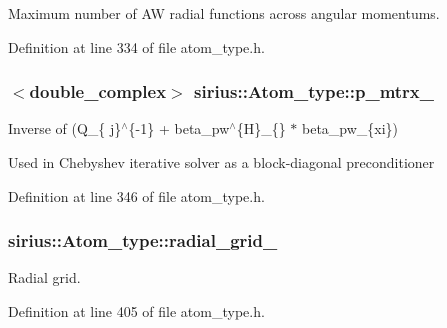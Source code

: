 Maximum number of A\+W radial functions across angular momentums. 



Definition at line 334 of file atom\+\_\+type.\+h.

\hypertarget{classsirius_1_1_atom__type_ab6a5196906a65c23cc6ef5890f262502}{}
\subsubsection[{p\+\_\+mtrx\+\_\+}]{$<$double\+\_\+complex$>$ sirius\+::\+Atom\+\_\+type\+::p\+\_\+mtrx\+\_\+\hspace{0.3cm}{\ttfamily [private]}}\label{classsirius_1_1_atom__type_ab6a5196906a65c23cc6ef5890f262502}


Inverse of (Q\+\_\+\{ \textquotesingle{}j\}$^\wedge$\{-\/1\} + beta\+\_\+pw$^\wedge$\{H\}\+\_\+\{\} $\ast$ beta\+\_\+pw\+\_\+\{xi\textquotesingle{}\}) 

Used in Chebyshev iterative solver as a block-\/diagonal preconditioner 

Definition at line 346 of file atom\+\_\+type.\+h.

\hypertarget{classsirius_1_1_atom__type_a84128b76a6e32374826af11fb270c0b1}{}
\subsubsection[{radial\+\_\+grid\+\_\+}]{ sirius\+::\+Atom\+\_\+type\+::radial\+\_\+grid\+\_\+\hspace{0.3cm}{\ttfamily [protected]}}\label{classsirius_1_1_atom__type_a84128b76a6e32374826af11fb270c0b1}


Radial grid. 



Definition at line 405 of file atom\+\_\+type.\+h.

\hypertarget{classsirius_1_1_atom__type_a6eecfa70423000229cddd9af4726f6c1}{}
